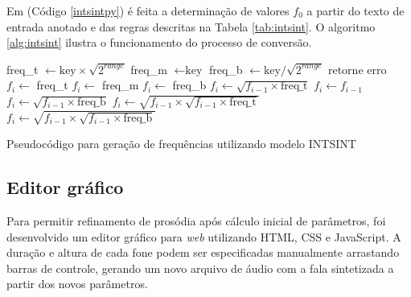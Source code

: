 Em  (Código \ref{intsintpy}) é feita a determinação de valores $ f_0 $ a partir do texto de
entrada anotado e das regras descritas na Tabela \ref{tab:intsint}. O
algoritmo \ref{alg:intsint} ilustra o funcionamento do processo de conversão.

\begin{algorithm}[H]
\begin{algorithmic}
\STATE freq\_t $ \gets \text{key} \times \sqrt{2^{range}}$
\STATE freq\_m $ \gets \text{key} $
\STATE freq\_b $ \gets \text{key} / \sqrt{2^{range}} $
\STATE retorne erro 
\ENDIF
{}
    \STATE $ f_i \gets $ freq\_t
    \STATE $ f_i \gets $ freq\_m
    \STATE $ f_i \gets $ freq\_b
  \STATE $ f_i \gets \sqrt{f_{i - 1} \times \text{freq\_t}} $
    \STATE $ f_i \gets f_{i - 1} $
  \STATE $ f_i \gets \sqrt{f_{i - 1} \times \text{freq\_b}} $
  \STATE $ f_i \gets \sqrt{f_{i - 1} \times  \sqrt{f_{i - 1} \times \text{freq\_t}}} $
  \STATE $ f_i \gets \sqrt{f_{i - 1} \times  \sqrt{f_{i - 1} \times \text{freq\_b}}}  $
  \ENDIF
\ENDFOR
\end{algorithmic}
\caption{Pseudocódigo para geração de frequências utilizando modelo INTSINT}
\label{alg:intsint}
\end{algorithm}


\subsection{Editor gráfico}
Para permitir refinamento de prosódia após cálculo inicial de parâmetros, foi
desenvolvido um editor gráfico para \emph{web} utilizando HTML, CSS e
JavaScript. A duração e altura de cada fone podem ser especificadas manualmente
arrastando barras de controle, gerando um novo arquivo de áudio com a fala
sintetizada a partir dos novos parâmetros.

